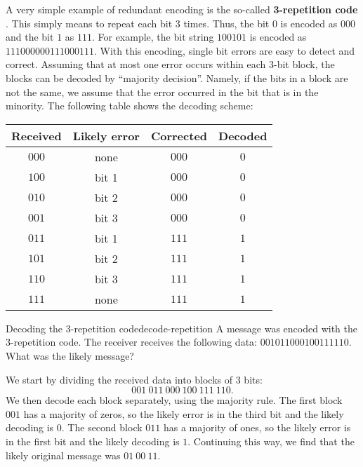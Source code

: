 A very simple example of redundant encoding is the so-called
\textbf{3-repetition code}%
%
. This simply means to repeat each bit 3
times. Thus, the bit $0$ is encoded as $000$ and the bit $1$ as
$111$. For example, the bit string $100101$ is encoded as
$111000000111000111$. With this encoding, single bit errors are easy
to detect and correct. Assuming that at most one error occurs within
each 3-bit block, the blocks can be decoded by ``majority
decision''. Namely, if the bits in a block are not the same, we assume
that the error occurred in the bit that is in the minority. The
following table shows the decoding scheme:
\begin{center}
  \begin{tabular}{|c|c|c|c|}
    \hline
    Received & Likely error & Corrected & Decoded \\\hline
    $000$    & none         & $000$     & $0$     \\
    $100$    & bit 1        & $000$     & $0$     \\
    $010$    & bit 2        & $000$     & $0$     \\
    $001$    & bit 3        & $000$     & $0$     \\
    $011$    & bit 1        & $111$     & $1$     \\
    $101$    & bit 2        & $111$     & $1$     \\
    $110$    & bit 3        & $111$     & $1$     \\
    $111$    & none         & $111$     & $1$     \\\hline
  \end{tabular}
\end{center}

\begin{example}{Decoding the 3-repetition code}{decode-repetition}
  A message was encoded with the 3-repetition code. The receiver
  receives the following data: $001011000100111110$. What was the
  likely message?
\end{example}

\begin{solution}
  We start by dividing the received data into blocks of 3 bits:
  \begin{equation*}
    001~011~000~100~111~110.
  \end{equation*}
  We then decode each block separately, using the majority rule.
  The first block $001$ has a majority of zeros, so the likely error is
  in the third bit and the likely decoding is $0$. The second block $011$
  has a majority of ones, so the likely error is in the first bit and
  the likely decoding is $1$. Continuing this way, we find that the
  likely original message was $01~00~11$.
\end{solution}

